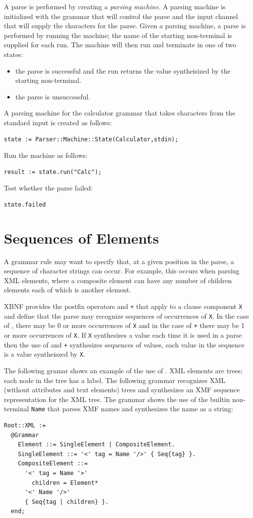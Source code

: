 \documentclass{article}
\begin{document}
A parse is performed by creating a {\em parsing machine}. A parsing machine
is initialized with the grammar that will control the parse and the input
channel that will supply the characters for the parse. Given a parsing
machine, a parse is performed by running the machine; the name of the
starting non-terminal is supplied for each run. The machine will then run
and terminate in one of two states:
\begin{itemize}
\item the parse is successful and the run returns the value syntheisized by 
the starting non-terminal.
\item the parse is unsuccessful.
\end{itemize}
A parsing machine for the calculator grammar that takes characters from
the standard input is created as follows:
\begin{verbatim}
state := Parser::Machine::State(Calculator,stdin);
\end{verbatim}
Run the machine as follows:
\begin{verbatim}
result := state.run("Calc");
\end{verbatim}
Test whether the parse failed:
\begin{verbatim}
state.failed
\end{verbatim}

\section{Sequences of Elements}

A grammar rule may want to specify that, at a given position in the parse,
a sequence of character strings can occur. For example, this occurs when
parsing XML elements, where a composite element can have any number of
children elements each of which is another element.

XBNF provides the postfix operators {\tt *} and {\tt +} that apply to
a clause component {\tt X} and define that the parse may recognize
sequences of occurrences of {\tt X}. In the case of {\tt *}, there may be
0 or more occurrences of {\tt X} and in the case of {\tt +} there may be
1 or more occurrences of {\tt X}. If {\tt X} synthesizes a value each time it is
used in a parse then the use of {\tt *} and {\tt +} synthesizes sequences
of values, each value in the sequence is a value syntheiszed by {\tt X}.

The following gramar shows an example of the use of {\tt *}. XML elements
are trees; each node in the tree has a label. The following grammar recognizes
XML (without attributes and text elements) trees and synthesizes an XMF
sequence representation for the XML tree. The grammar shows the use of the
builtin non-terminal {\tt Name} that parses XMF names and synthesizes the
name as a string:
\begin{verbatim}
Root::XML :=
  @Grammar
    Element ::= SingleElement | CompositeElement.  
    SingleElement ::= '<' tag = Name '/>' { Seq{tag} }.
    CompositeElement ::= 
      '<' tag = Name '>' 
        children = Element*  
      '<' Name '/>' 
      { Seq{tag | children} }. 
  end; 
\end{verbatim}
\end{document}
